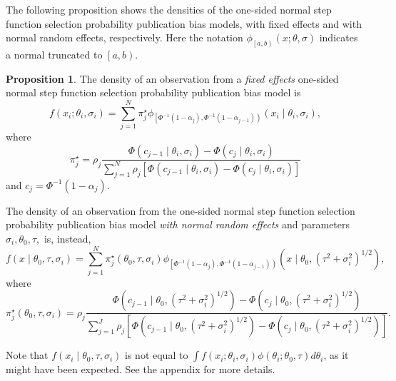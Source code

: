 \documentclass{article}
\theoremstyle{plain}
\theoremstyle{definition}
\newtheorem{prop}[theorem]{Proposition}
\renewcommand{\sqrt}[1]{(#1)^{1/2}}
\begin{document}
The following proposition shows the densities of the one-sided normal step function selection probability publication bias models, with fixed effects and with normal random effects, respectively. Here the notation $\phi_{\left[a,b\right)}\left(x;\theta,\sigma\right)$ indicates a normal truncated to $\left[a,b\right)$.
\begin{prop}
\label{prop:One-sided normal discrete probability vector publication bias model-1}
The density of an observation from a \emph{fixed effects} one-sided normal step function selection probability publication bias model is
\begin{equation}\label{eq:Fixed effects, publication bias}
f\left(x_{i};\theta_{i},\sigma_{i}\right) = \sum_{j=1}^{N}\pi_{j}^\star\phi_{\left[\Phi^{-1}\left(1-\alpha_{j}\right),\Phi^{-1}\left(1-\alpha_{j-1}\right)\right)}\left(x_{i}\mid\theta_{i},\sigma_{i}\right),
\end{equation}
where
$$
\pi_{j}^{\star}=\rho_{j}\frac{\Phi\left(c_{j-1}\mid\theta_{i},\sigma_{i}\right)-\Phi\left(c_{j}\mid\theta_{i},\sigma_{i}\right)}{\sum_{j=1}^{N}\rho_{j}\left[\Phi\left(c_{j-1}\mid\theta_{i},\sigma_{i}\right)-\Phi\left(c_{j}\mid\theta_{i},\sigma_{i}\right)\right]}
$$
and $c_{j}=\Phi^{-1}\left(1-\alpha_{j}\right)$.

The density of an observation from the one-sided normal step function selection probability publication bias model \emph{with normal random effects} and parameters $\sigma_{i},\theta_{0},\tau,$ is, instead,
\begin{equation}\label{eq:Random effects, publication bias}
f\left(x\mid\theta_{0},\tau,\sigma_{i}\right)=\sum_{j=1}^{N}\pi_{j}^{\star}\left(\theta_0,\tau,\sigma_{i}\right)\phi_{\left[\Phi^{-1}\left(1-\alpha_{j}\right),\Phi^{-1}\left(1-\alpha_{j-1}\right)\right)}\left(x\mid\theta_{0},\sqrt{\tau^{2}+\sigma_{i}^{2}}\right),
\end{equation}
where 
\[
\pi_{j}^{\star}\left(\theta_0,\tau,\sigma_{i}\right)=\rho_{j}\frac{\Phi\left(c_{j-1}\mid\theta_{0},\sqrt{\tau^{2}+\sigma_{i}^{2}}\right)-\Phi\left(c_{j}\mid\theta_{0},\sqrt{\tau^{2}+\sigma_{i}^{2}}\right)}{\sum_{j=1}^{J}\rho_{j}\left[\Phi\left(c_{j-1}\mid\theta_{0},\sqrt{\tau^{2}+\sigma_{i}^{2}}\right)-\Phi\left(c_{j}\mid\theta_{0},\sqrt{\tau^{2}+\sigma_{i}^{2}}\right)\right]}.
\]
\end{prop}

Note that $f\left(x_i\mid\theta_{0},\tau,\sigma_i\right)$ is not equal to $\int f\left(x_{i};\theta_{i},\sigma_{i}\right)\phi\left(\theta_{i};\theta_{0},\tau\right)d\theta_{i}$,
as it might have been expected. See the appendix for more details.
\end{document}
